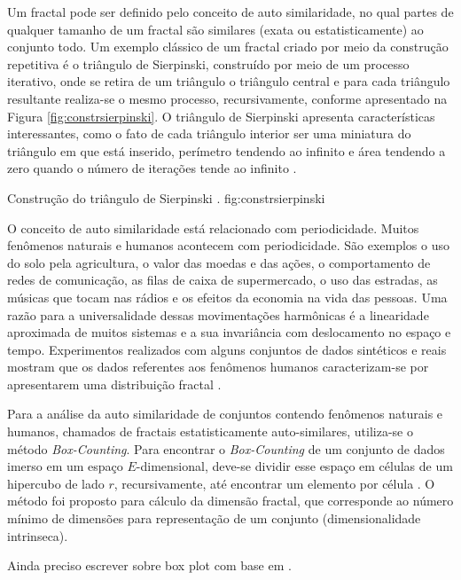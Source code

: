 Um fractal pode ser definido pelo conceito de auto similaridade, no qual partes de qualquer tamanho de um fractal são similares (exata ou estatisticamente) ao conjunto todo. Um exemplo clássico de um fractal criado por meio da construção repetitiva é o triângulo de Sierpinski, construído por meio de um processo iterativo, onde se retira de um triângulo o triângulo central e para cada triângulo resultante realiza-se o mesmo processo, recursivamente, conforme apresentado na Figura \ref{fig:constrsierpinski}. O triângulo de Sierpinski apresenta características interessantes, como o fato de cada triângulo interior ser uma miniatura do triângulo em que está inserido, perímetro tendendo ao infinito e área tendendo a zero quando o número de iterações tende ao infinito \cite{Schroeder91}. 

{Construção do triângulo de Sierpinski \cite{Schroeder91}.}
{fig:constrsierpinski}

O conceito de auto similaridade está relacionado com periodicidade. Muitos fenômenos naturais e humanos acontecem com periodicidade. São exemplos o uso do solo pela agricultura, o valor das moedas e das ações, o comportamento de redes de comunicação, as filas de caixa de supermercado, o uso das estradas, as músicas que tocam nas rádios e os efeitos da economia na vida das pessoas. Uma razão para a universalidade dessas movimentações harmônicas é a linearidade aproximada de muitos sistemas e a sua invariância com deslocamento no espaço e tempo. Experimentos realizados com alguns conjuntos de dados sintéticos e reais mostram que os dados referentes aos fenômenos humanos caracterizam-se por apresentarem uma distribuição fractal \cite{Traina2010}.

Para a análise da auto similaridade de conjuntos contendo fenômenos naturais e humanos, chamados de fractais estatisticamente auto-similares, utiliza-se o método \textit{Box-Counting}. Para encontrar o \textit{Box-Counting} de um conjunto de dados imerso em um espaço $E$-dimensional, deve-se dividir esse espaço em células de um hipercubo de lado $r$, recursivamente, até encontrar um elemento por célula \cite{Traina2010}. O método foi proposto para cálculo da dimensão fractal, que corresponde ao número mínimo de dimensões para representação de um conjunto (dimensionalidade intrinseca). 

Ainda preciso escrever sobre box plot com base em \cite{Traina2010}.
